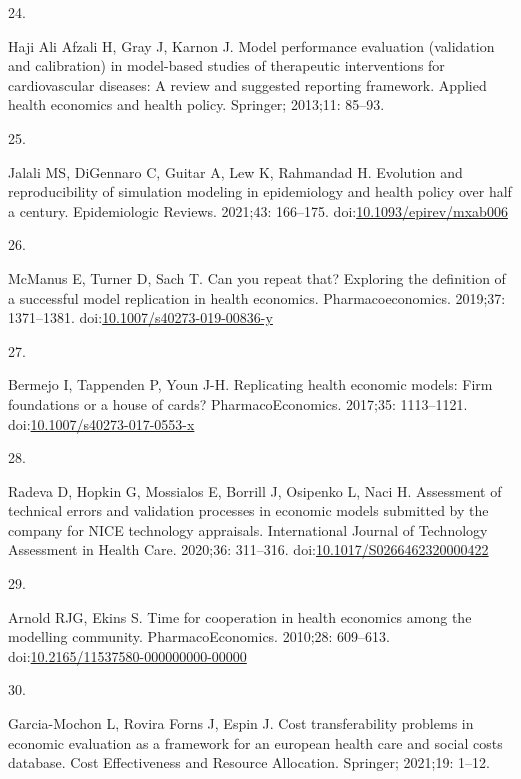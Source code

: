 \documentclass[
]{article}
\newlength{\cslhangindent}
\newlength{\csllabelwidth}
\newlength{\cslentryspacingunit} %
\newenvironment{CSLReferences}[2] %
 {%
  \setlength{\parindent}{0pt}
  \ifodd #1
  \let\oldpar\par
  \def\par{\hangindent=\cslhangindent\oldpar}
  \fi
  \setlength{\parskip}{#2\cslentryspacingunit}
 }%
 {}
\newcommand{\CSLLeftMargin}[1]{\parbox[t]{\csllabelwidth}{#1}}
\newcommand{\CSLRightInline}[1]{\parbox[t]{\linewidth - \csllabelwidth}{#1}\break}
\begin{document}
\begin{CSLReferences}{0}{0}
\leavevmode{}%
\CSLLeftMargin{24. }%
\CSLRightInline{Haji Ali Afzali H, Gray J, Karnon J. Model performance evaluation (validation and calibration) in model-based studies of therapeutic interventions for cardiovascular diseases: A review and suggested reporting framework. Applied health economics and health policy. Springer; 2013;11: 85--93. }

\leavevmode{}%
\CSLLeftMargin{25. }%
\CSLRightInline{Jalali MS, DiGennaro C, Guitar A, Lew K, Rahmandad H. Evolution and reproducibility of simulation modeling in epidemiology and health policy over half a century. Epidemiologic Reviews. 2021;43: 166--175. doi:\href{https://doi.org/10.1093/epirev/mxab006}{10.1093/epirev/mxab006}}

\leavevmode{}%
\CSLLeftMargin{26. }%
\CSLRightInline{McManus E, Turner D, Sach T. Can you repeat that? Exploring the definition of a successful model replication in health economics. Pharmacoeconomics. 2019;37: 1371--1381. doi:\href{https://doi.org/10.1007/s40273-019-00836-y}{10.1007/s40273-019-00836-y}}

\leavevmode{}%
\CSLLeftMargin{27. }%
\CSLRightInline{Bermejo I, Tappenden P, Youn J-H. Replicating health economic models: Firm foundations or a house of cards? PharmacoEconomics. 2017;35: 1113--1121. doi:\href{https://doi.org/10.1007/s40273-017-0553-x}{10.1007/s40273-017-0553-x}}

\leavevmode{}%
\CSLLeftMargin{28. }%
\CSLRightInline{Radeva D, Hopkin G, Mossialos E, Borrill J, Osipenko L, Naci H. Assessment of technical errors and validation processes in economic models submitted by the company for NICE technology appraisals. International Journal of Technology Assessment in Health Care. 2020;36: 311--316. doi:\href{https://doi.org/10.1017/S0266462320000422}{10.1017/S0266462320000422}}

\leavevmode{}%
\CSLLeftMargin{29. }%
\CSLRightInline{Arnold RJG, Ekins S. Time for cooperation in health economics among the modelling community. PharmacoEconomics. 2010;28: 609--613. doi:\href{https://doi.org/10.2165/11537580-000000000-00000}{10.2165/11537580-000000000-00000}}

\leavevmode{}%
\CSLLeftMargin{30. }%
\CSLRightInline{Garcia-Mochon L, Rovira Forns J, Espin J. Cost transferability problems in economic evaluation as a framework for an european health care and social costs database. Cost Effectiveness and Resource Allocation. Springer; 2021;19: 1--12. }


\end{CSLReferences}
\end{document}
